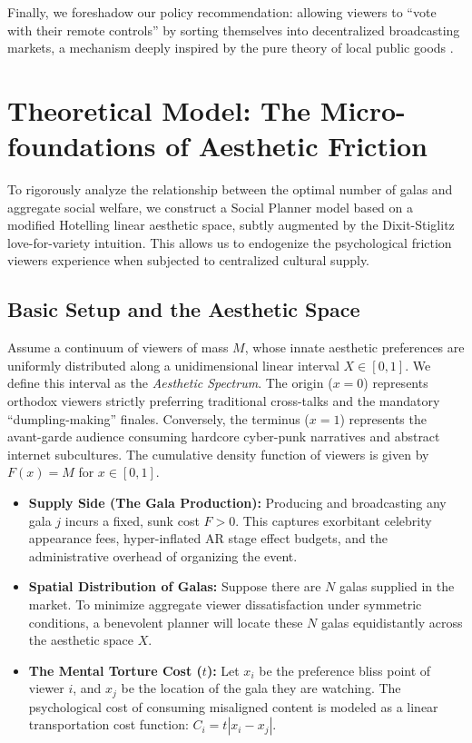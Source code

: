 \documentclass[AER]{AEA}
\begin{document}
Finally, we foreshadow our policy recommendation: allowing viewers to ``vote with their remote controls'' by sorting themselves into decentralized broadcasting markets, a mechanism deeply inspired by the pure theory of local public goods \citep{tiebout1956}.

\section{Theoretical Model: The Micro-foundations of Aesthetic Friction}

To rigorously analyze the relationship between the optimal number of galas and aggregate social welfare, we construct a Social Planner model based on a modified Hotelling linear aesthetic space, subtly augmented by the Dixit-Stiglitz love-for-variety intuition. This allows us to endogenize the psychological friction viewers experience when subjected to centralized cultural supply.

\subsection{Basic Setup and the Aesthetic Space}

Assume a continuum of viewers of mass $M$, whose innate aesthetic preferences are uniformly distributed along a unidimensional linear interval $X \in [0, 1]$. We define this interval as the \textit{Aesthetic Spectrum}. The origin ($x = 0$) represents orthodox viewers strictly preferring traditional cross-talks and the mandatory ``dumpling-making'' finales. Conversely, the terminus ($x = 1$) represents the avant-garde audience consuming hardcore cyber-punk narratives and abstract internet subcultures. The cumulative density function of viewers is given by $F(x) = M$ for $x \in [0, 1]$.

\begin{itemize}
    \item \textbf{Supply Side (The Gala Production):} Producing and broadcasting any gala $j$ incurs a fixed, sunk cost $F > 0$. This captures exorbitant celebrity appearance fees, hyper-inflated AR stage effect budgets, and the administrative overhead of organizing the event.
    \item \textbf{Spatial Distribution of Galas:} Suppose there are $N$ galas supplied in the market. To minimize aggregate viewer dissatisfaction under symmetric conditions, a benevolent planner will locate these $N$ galas equidistantly across the aesthetic space $X$.
    \item \textbf{The Mental Torture Cost ($t$):} Let $x_i$ be the preference bliss point of viewer $i$, and $x_j$ be the location of the gala they are watching. The psychological cost of consuming misaligned content is modeled as a linear transportation cost function: $C_i = t |x_i - x_j|$.
\end{itemize}
\end{document}
